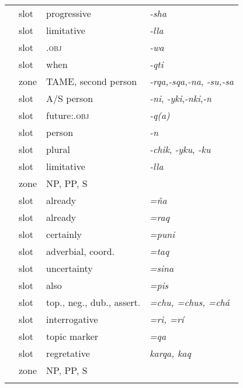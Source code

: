 \documentclass[output=paper]{langscibook}
\begin{document}
\begin{longtable}{Slll}
\label{vpos:prog}    & slot  & progressive       & \textit{-sha}    \\
\label{vpos:lla1}    & slot  & limitative        & \textit{-lla}                  \\
\label{vpos:1.obj}   & slot  & \First{}.\textsc{obj}    & \textit{-wa}     \\
\label{vpos:when}    & slot  & when              & \textit{-qti}                  \\
\label{vpos:tame}    & zone  & TAME, second person       & \textit{-rqa,-sqa,-na}, \textit{-su,-sa}       \\ 
\label{vpos:SAsuf}  & slot     & A/S person    &    \textit{-ni}, \textit{-yki},\textit{-nki},\textit{-n}    \\ 
\label{vpos:3.obj}  & slot     & future:\Third{}.\textsc{obj}    &    \textit{-q(a)}   \\ 
\label{vpos:SAsuf2}  & slot     & person    &    \textit{-n} \\ 
\label{vpos:plural} & slot & plural & \textit{-chik}, \textit{-yku}, \textit{-ku} \\
\label{vpos:lla2}    & slot  & limitative    & \textit{-lla}     \\ 
\label{vpos:XP3}     & zone  & NP, PP, S &      \\
\label{vpos:ña2}     & slot  & already   & \textit{=ña}                  \\
\label{vpos:raq2}     & slot  & already   & \textit{=raq}            \\
\label{vpos:puni2}   & slot  & certainly     & \textit{=puni} \\
\label{vpos:taq2} & slot & adverbial, coord.         & \textit{=taq}   \\
\label{vpos:sina2}    & slot  & uncertainty   & \textit{=sina}     \\
\label{vpos:pis2}    & slot  & also   & \textit{=pis}     \\
\label{vpos:clitics2} & slot & top., neg., dub., assert. & \textit{=chu, =chus, =chá}   \\
\label{vpos:ri2} & slot & interrogative & \textit{=ri, =rí}   \\
\label{vpos:qa2} & slot & topic marker  & \textit{=qa}   \\
\label{vpos:aux}    & slot  & regretative   &   \textit{karqa, kaq} \\
\label{vpos:XP4}    & zone  &   NP, PP, S   &   \\
\lspbottomrule
\end{longtable}
\end{document}

